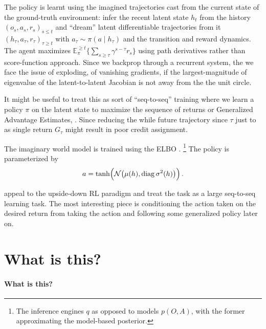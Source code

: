 \documentclass[acmsmall, nonacm]{acmart}
\newcommand{\attn}[1]{{\color{magenta}{\textbf{#1}}}}
\begin{document}
The policy is learnt using the imagined trajectories cast from the current state of the 
ground-truth environment: infer the recent latent state $h_t$ from the history $
  (o_s, a_s, r_s)_{s \leq t}
$ and ``dream'' latent differentiable trajectories from it $
  (h_\tau, a_\tau, r_\tau)_{\tau \geq t}
$ with $a_\tau \sim \pi(a\mid h_\tau)$ and the transition and reward dynamics. The agent
maximizes $
  \mathbb{E}_{\pi}^{\geq t} \bigl\{
      \sum_{s \geq \tau} \gamma^{s - \tau} r_s
    \bigr\}
$ using path derivatives rather than score-function approach.
% 
Since we backprop through a recurrent system, the we face the issue of exploding, of
vanishing gradients, if the largest-magnitude of eigenvalue of the latent-to-latent
Jacobian is not away from the the unit circle.

It might be useful to treat this as sort of ``seq-to-seq'' training where we learn
a policy $\pi$ on the latent state to maximize the sequence of returns or Generalized
Advantage Estimates, \citep{schulman_high-dimensional_2016}. Since reducing the while
future trajectory since $\tau$ just to as single return $G_\tau$ might result in poor
credit assignment.

The imaginary world model is trained using the ELBO \attn{what variational approximations?}.
\footnote{
  The inference engines $q$ as opposed to models $p(O, A)$, with the former approximating
  the model-based posterior.
}
%
The policy is parameterized by
$$
a = \tanh\Bigl(\mathcal{N}\bigl(
    \mu(h), \operatorname{diag}{\sigma^2(h)}
  \bigr)\Bigr)
  \,. $$


\citet{chen_decision_2021} appeal to the upside-down RL paradigm and treat the task as
a large seq-to-seq learning task. The most interesting piece is conditioning the action
taken on the desired return from taking the action and following some generalized policy
later on.


\section{What is this?}

\paragraph{What is this?} %
\label{par:what_is_this}
\end{document}
